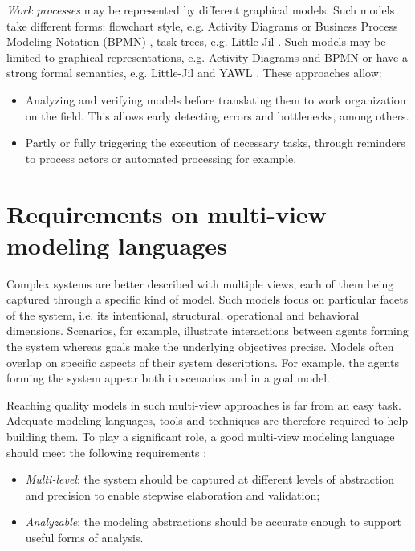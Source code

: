 
\emph{Work processes} may be represented by different graphical models. Such models take different forms: flowchart style, e.g. Activity Diagrams \cite{OMG:2004} or Business Process Modeling Notation (BPMN) \cite{OMG:2008}, task trees, e.g. Little-Jil \cite{Clarke:2008}. Such models may be limited to graphical representations, e.g. Activity Diagrams and BPMN or have a strong formal semantics, e.g. Little-Jil and YAWL \cite{Vanderaalst:2005}. These approaches allow:

\begin{itemize}
\item Analyzing and verifying models before translating them to work organization on the field. This allows early detecting errors and bottlenecks, among others.
\item Partly or fully triggering the execution of necessary tasks, through reminders to process actors or automated processing for example.
\end{itemize}

\section{Requirements on multi-view modeling languages}

Complex systems are better described with multiple views, each of them being captured through a specific kind of model. Such models focus on particular facets of the system, i.e. its intentional, structural, operational and behavioral dimensions. Scenarios, for example, illustrate interactions between agents forming the system whereas goals make the underlying objectives precise. Models often overlap on specific aspects of their system descriptions. For example, the agents forming the system appear both in scenarios and in a goal model.

Reaching quality models in such multi-view approaches is far from an easy task. Adequate modeling languages, tools and techniques are therefore required to help building them. To play a significant role, a good multi-view modeling language should meet the following requirements \cite{VanLamsweerde:2009}:

\begin{itemize}
\item \emph{Multi-level}: the system should be captured at different levels of abstraction and precision to enable stepwise elaboration and validation;
\item \emph{Analyzable}: the modeling abstractions should be accurate enough to support useful forms of analysis.
\end{itemize}


